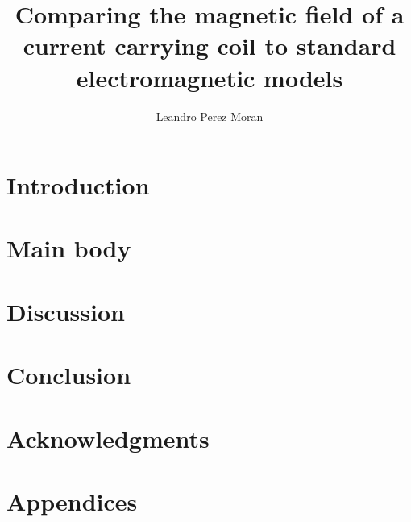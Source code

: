 \documentclass[aps,prl,reprint,groupedaddress]{revtex4-2}
\begin{document}
\title{Comparing the magnetic field of a current carrying coil to standard electromagnetic models}
\author{Leandro Perez Moran}

\begin{abstract}
    
\end{abstract}

\maketitle

\section{Introduction}


\section{Main body}


\section{Discussion}


\section{Conclusion}


\section{Acknowledgments}


\clearpage
\section{Appendices}

\end{document}
